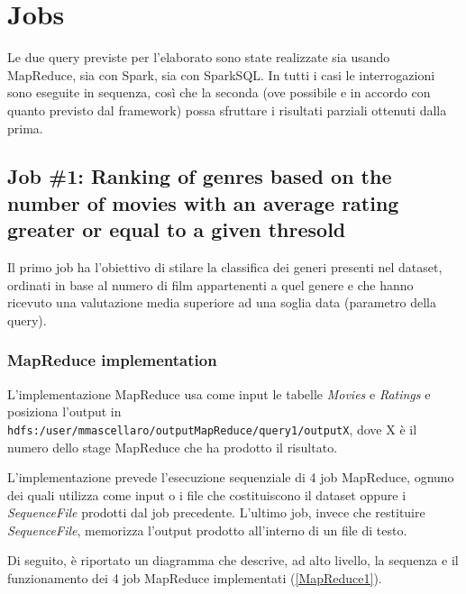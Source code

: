 \documentclass[10pt]{article}
\begin{document}
\section{Jobs}

Le due query previste per l'elaborato sono state realizzate sia usando MapReduce, sia con Spark, sia con SparkSQL. In tutti i casi le interrogazioni sono eseguite in sequenza, così che la seconda (ove possibile e in accordo con quanto previsto dal framework) possa sfruttare i risultati parziali ottenuti dalla prima.

\subsection{Job \#1: Ranking of genres based on the number of movies with an average rating greater or equal to a given thresold}

Il primo job ha l'obiettivo di stilare la classifica dei generi presenti nel dataset, ordinati in base al numero di film appartenenti a quel genere e che hanno ricevuto una valutazione media superiore ad una soglia data (parametro della query).

\subsubsection{MapReduce implementation}

L'implementazione MapReduce usa come input le tabelle \textit{Movies} e \textit{Ratings} e posiziona l'output in \texttt{hdfs:/user/mmascellaro/outputMapReduce/query1/outputX}, dove X è il numero dello stage MapReduce che ha prodotto il risultato.

L'implementazione prevede l'esecuzione sequenziale di 4 job MapReduce, ognuno dei quali utilizza come input o i file che costituiscono il dataset oppure i \textit{SequenceFile} prodotti dal job precedente. L'ultimo job, invece che restituire \textit{SequenceFile}, memorizza l'output prodotto all'interno di un file di testo.

Di seguito, è riportato un diagramma che descrive, ad alto livello, la sequenza e il funzionamento dei 4 job MapReduce implementati (\ref{MapReduce1}).
\end{document}
